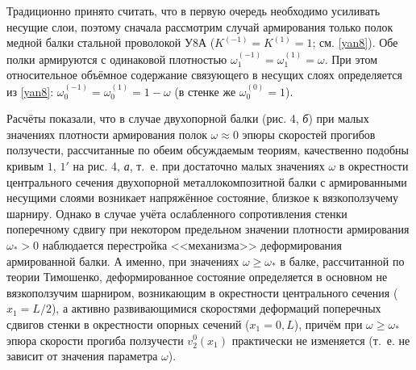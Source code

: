 Традиционно принято считать, что в первую очередь необходимо усиливать несущие слои, поэтому сначала рассмотрим случай армирования только полок медной балки стальной проволокой У8А ($K^{(-1)}=K^{(1)}=1$; см. \eqref{yan8}). Обе полки армируются с одинаковой плотностью $\omega_1^{(-1)}=\omega_1^{(1)}=\omega$. При этом относительное объёмное содержание связующего в несущих слоях определяется из \eqref{yan8}: $\omega_0^{(-1)}=\omega_0^{(1)}=1-\omega$ (в стенке же $\omega_0^{(0)}=1$).

Расчёты показали, что в случае двухопорной балки (рис. 4, {\sl б}) при малых значениях плотности армирования полок $\omega\approx0$ эпюры скоростей прогибов ползучести, рассчитанные по обеим обсуждаемым теориям, качественно подобны кривым $1$, $1'$ на рис. 4, {\sl а}, т.~е. при достаточно малых значениях $\omega$ в окрестности центрального сечения двухопорной металлокомпозитной балки с армированными несущими слоями возникает напряжённое состояние, близкое к вязкоползучему шарниру. Однако в случае учёта ослабленного сопротивления стенки поперечному сдвигу при некотором предельном значении плотности армирования $\omega_*>0$ наблюдается перестройка <<механизма>> деформирования армированной балки. А именно, при значениях $\omega\ge\omega_*$ в балке, рассчитанной по теории Тимошенко, деформированное состояние определяется в основном не вязкоползучим шарниром, возникающим в окрестности центрального сечения ($x_1=L/2$), а активно развивающимися скоростями деформаций поперечных сдвигов стенки в окрестности опорных сечений ($x_1=0,L$), причём при $\omega\ge\omega_*$ эпюра скорости прогиба ползучести $v_2^0(x_1)$ практически не изменяется (т.~е. не зависит от значения параметра $\omega$).

